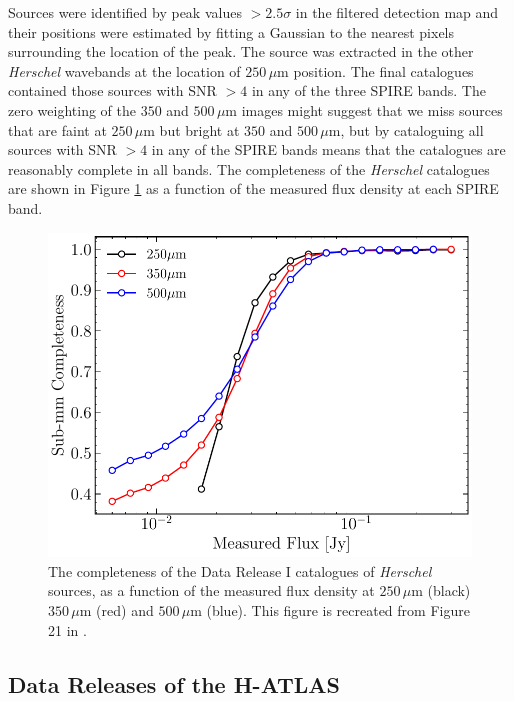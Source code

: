 Sources were identified by peak values $> 2.5\sigma$ in the filtered detection map and their positions were estimated by fitting a Gaussian to the nearest pixels surrounding the location of the peak. The source was extracted in the other \textit{Herschel} wavebands at the location of $250\,\mu$m position. The final catalogues contained those sources with SNR $> 4$ in any of the three SPIRE bands. The zero weighting of the $350$ and $500\,\mu$m images might suggest that we miss sources that are faint at $250\,\mu$m but bright at $350$ and $500\,\mu$m, but by cataloguing all sources with SNR $> 4$ in any of the SPIRE bands means that the catalogues are reasonably complete in all bands. The completeness of the \textit{Herschel} catalogues are shown in Figure \ref{fig:submm_completeness} as a function of the measured flux density at each SPIRE band.

\begin{figure}
    \centering
	\includegraphics[width=0.8\columnwidth]{Figures/Figure_2_1.pdf}
	\caption[Completeness of H-ATLAS DR1 catalogue as a function of $250\,\mu$m flux]{The completeness of the Data Release I catalogues of \textit{Herschel} sources, as a function of the measured flux density at $250\,\mu$m (black) $350\,\mu$m (red) and $500\,\mu$m (blue). This figure is recreated from Figure 21 in \citealt{Valiante_2016}.}
	\label{fig:submm_completeness}
\end{figure}

\subsection{Data Releases of the H-ATLAS}
\label{sec:Data Releases of the H-ATLAS}

